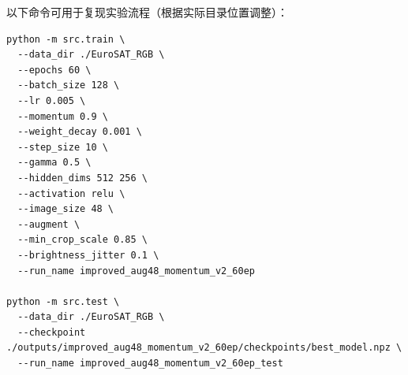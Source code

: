 \documentclass[12pt,a4paper,fontset=none]{ctexart}
\begin{document}
以下命令可用于复现实验流程（根据实际目录位置调整）：

\begin{verbatim}
python -m src.train \
  --data_dir ./EuroSAT_RGB \
  --epochs 60 \
  --batch_size 128 \
  --lr 0.005 \
  --momentum 0.9 \
  --weight_decay 0.001 \
  --step_size 10 \
  --gamma 0.5 \
  --hidden_dims 512 256 \
  --activation relu \
  --image_size 48 \
  --augment \
  --min_crop_scale 0.85 \
  --brightness_jitter 0.1 \
  --run_name improved_aug48_momentum_v2_60ep

python -m src.test \
  --data_dir ./EuroSAT_RGB \
  --checkpoint ./outputs/improved_aug48_momentum_v2_60ep/checkpoints/best_model.npz \
  --run_name improved_aug48_momentum_v2_60ep_test
\end{verbatim}
\end{document}
